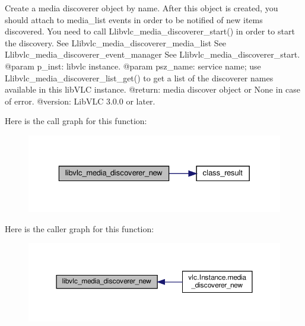 \begin{DoxyVerb}Create a media discoverer object by name.
After this object is created, you should attach to media_list events in
order to be notified of new items discovered.
You need to call L{libvlc_media_discoverer_start}() in order to start the
discovery.
See L{libvlc_media_discoverer_media_list}
See L{libvlc_media_discoverer_event_manager}
See L{libvlc_media_discoverer_start}.
@param p_inst: libvlc instance.
@param psz_name: service name; use L{libvlc_media_discoverer_list_get}() to get a list of the discoverer names available in this libVLC instance.
@return: media discover object or None in case of error.
@version: LibVLC 3.0.0 or later.
\end{DoxyVerb}
 Here is the call graph for this function\+:
\nopagebreak
\begin{figure}[H]
\begin{center}
\leavevmode
\includegraphics[width=329pt]{namespacevlc_aca3af54c1b5d61bc7877d189b8fda18b_cgraph}
\end{center}
\end{figure}
Here is the caller graph for this function\+:
\nopagebreak
\begin{figure}[H]
\begin{center}
\leavevmode
\includegraphics[width=350pt]{namespacevlc_aca3af54c1b5d61bc7877d189b8fda18b_icgraph}
\end{center}
\end{figure}
\mbox{\label{namespacevlc_a767b87c1a19544f94b98794de5728cde}} 
